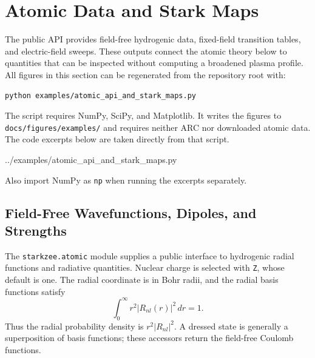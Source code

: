 \section{Atomic Data and Stark Maps}
\label{sec:atomic_api}
\begingroup
{}

The public API provides field-free hydrogenic data, fixed-field transition
tables, and electric-field sweeps. These outputs connect the atomic theory
below to quantities that can be inspected without computing a broadened
plasma profile. All figures in this section can be regenerated from the
repository root with:
\begin{lstlisting}[basicstyle=\small\ttfamily,columns=fullflexible]
python examples/atomic_api_and_stark_maps.py
\end{lstlisting}
The script requires NumPy, SciPy, and Matplotlib. It writes the figures to
\texttt{docs/figures/}\allowbreak\texttt{examples/} and requires neither ARC
nor downloaded atomic data. The code excerpts below are taken directly from
that script.

\begin{minipage}{\linewidth}

  {../examples/atomic_api_and_stark_maps.py}
\end{minipage}
Also import NumPy as \texttt{np} when running the excerpts separately.

\subsection{Field-Free Wavefunctions, Dipoles, and Strengths}

The \texttt{starkzee.atomic} module supplies a public interface to hydrogenic
radial functions and radiative quantities. Nuclear charge is selected with
\texttt{Z}, whose default is one. The radial coordinate is in Bohr radii,
and the radial basis functions satisfy
\begin{equation}
 \int_0^\infty r^2 |R_{nl}(r)|^2\,dr=1.
\end{equation}
Thus the radial probability density is $r^2|R_{nl}|^2$. A dressed state is
generally a superposition of basis functions; these accessors return the
field-free Coulomb functions.

